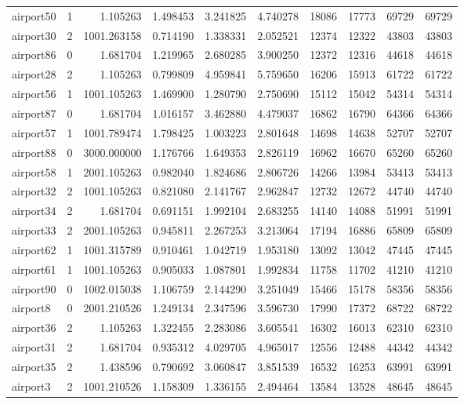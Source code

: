\begin{longtable}{|l|r|r|r|r|r|r|r|r|r|}
airport50 & 1 & 1.105263 & 1.498453 & 3.241825 & 4.740278 & 18086 & 17773 & 69729 & 69729 \\
airport30 & 2 & 1001.263158 & 0.714190 & 1.338331 & 2.052521 & 12374 & 12322 & 43803 & 43803 \\
airport86 & 0 & 1.681704 & 1.219965 & 2.680285 & 3.900250 & 12372 & 12316 & 44618 & 44618 \\
airport28 & 2 & 1.105263 & 0.799809 & 4.959841 & 5.759650 & 16206 & 15913 & 61722 & 61722 \\
airport56 & 1 & 1001.105263 & 1.469900 & 1.280790 & 2.750690 & 15112 & 15042 & 54314 & 54314 \\
airport87 & 0 & 1.681704 & 1.016157 & 3.462880 & 4.479037 & 16862 & 16790 & 64366 & 64366 \\
airport57 & 1 & 1001.789474 & 1.798425 & 1.003223 & 2.801648 & 14698 & 14638 & 52707 & 52707 \\
airport88 & 0 & 3000.000000 & 1.176766 & 1.649353 & 2.826119 & 16962 & 16670 & 65260 & 65260 \\
airport58 & 1 & 2001.105263 & 0.982040 & 1.824686 & 2.806726 & 14266 & 13984 & 53413 & 53413 \\
airport32 & 2 & 1001.105263 & 0.821080 & 2.141767 & 2.962847 & 12732 & 12672 & 44740 & 44740 \\
airport34 & 2 & 1.681704 & 0.691151 & 1.992104 & 2.683255 & 14140 & 14088 & 51991 & 51991 \\
airport33 & 2 & 2001.105263 & 0.945811 & 2.267253 & 3.213064 & 17194 & 16886 & 65809 & 65809 \\
airport62 & 1 & 1001.315789 & 0.910461 & 1.042719 & 1.953180 & 13092 & 13042 & 47445 & 47445 \\
airport61 & 1 & 1001.105263 & 0.905033 & 1.087801 & 1.992834 & 11758 & 11702 & 41210 & 41210 \\
airport90 & 0 & 1002.015038 & 1.106759 & 2.144290 & 3.251049 & 15466 & 15178 & 58356 & 58356 \\
airport8 & 0 & 2001.210526 & 1.249134 & 2.347596 & 3.596730 & 17990 & 17372 & 68722 & 68722 \\
airport36 & 2 & 1.105263 & 1.322455 & 2.283086 & 3.605541 & 16302 & 16013 & 62310 & 62310 \\
airport31 & 2 & 1.681704 & 0.935312 & 4.029705 & 4.965017 & 12556 & 12488 & 44342 & 44342 \\
airport35 & 2 & 1.438596 & 0.790692 & 3.060847 & 3.851539 & 16532 & 16253 & 63991 & 63991 \\
airport3 & 2 & 1001.210526 & 1.158309 & 1.336155 & 2.494464 & 13584 & 13528 & 48645 & 48645 \\

\end{longtable}
